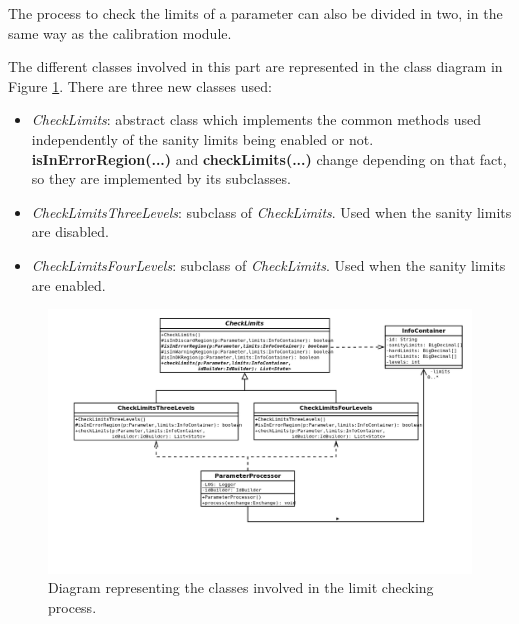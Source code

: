 The process to check the limits of a parameter can also be divided in two, in the same way as the calibration module.

The different classes involved in this  part are represented in the class diagram in Figure \ref{f5.10}. There are three new classes used:

\begin{itemize}
	\item \emph{CheckLimits}: abstract class which implements the common methods used independently of the sanity limits being enabled or not. \textbf{isInErrorRegion(...)} and \textbf{checkLimits(...)} change depending on that fact, so they are implemented by its subclasses.
	\item \emph{CheckLimitsThreeLevels}: subclass of \emph{CheckLimits}. Used when the sanity limits are disabled.
	\item \emph{CheckLimitsFourLevels}: subclass of \emph{CheckLimits}. Used when the sanity limits are enabled. 
\end{itemize}


\begin{figure}[H]
\centerline{\includegraphics[width=1.4\textwidth]{images/CheckLimitsClassDiagram.png}}
\caption{Diagram representing the classes involved in the limit checking process.}
\label{f5.10}
\end{figure}

